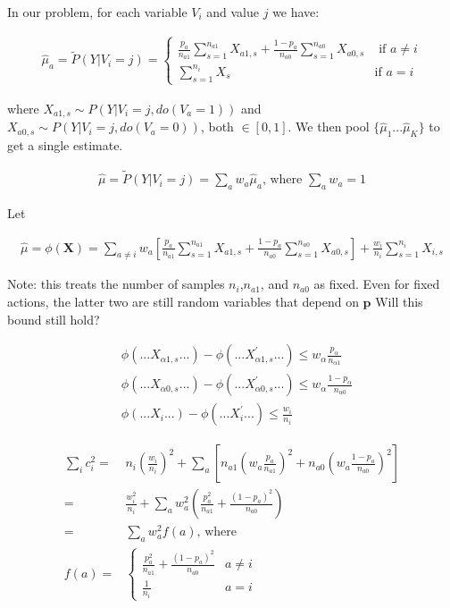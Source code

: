 \documentclass{article}
\newcommand{\eqn}[1]{\begin{align}#1\end{align}}
\theoremstyle{plain}
\theoremstyle{definition}
\begin{document}
In our problem, for each variable $V_i$ and value $j$ we have:

\eqn{
\hat{\mu}_a = \tilde{P}(Y|V_i = j)= \begin{cases}
\frac{p_a}{n_{a1}}\sum_{s=1}^{n_{a1}}X_{a1,s} + \frac{1-p_a}{n_{a0}}\sum_{s=1}^{n_{a0}}X_{a0,s} & \text{ if $a \neq i$}\\
\sum_{s=1}^{n_i}X_s & \text{if $a = i$}
\end{cases}
}

where $X_{a1,s}  \sim P(Y|V_i = j, do(V_a = 1))$ and $X_{a0,s}  \sim P(Y|V_i = j, do(V_a = 0))$, both $\in [0,1]$. We then pool $\{\hat{\mu}_1 ... \hat{\mu}_K \}$ to get a single estimate.

\eqn {
\hat{\mu} = \tilde{P}(Y|V_i = j)= \sum_a w_a \hat{\mu}_a \text{, where } \sum_a w_a = 1
}

Let 

\eqn {
\hat{\mu} = \phi(\boldsymbol{X}) = \sum_{a \neq i} w_a \left[ 
\frac{p_a}{n_{a1}}\sum_{s=1}^{n_{a1}}X_{a1,s} + \frac{1-p_a}{n_{a0}}\sum_{s=1}^{n_{a0}}X_{a0,s}
\right] + \frac{w_i}{n_i} \sum_{s=1}^{n_i}X_{i,s}
}

Note: this treats the number of samples $n_i$,$n_{a1}$, and $n_{a0}$ as fixed. Even for fixed actions, the latter two are still random variables that depend on $\boldsymbol{p}$  Will this bound still hold?  



\eqn {
&\phi(...X_{\alpha 1,s}...) - \phi(...X_{\alpha 1,s}^{'}...) \leq w_\alpha \frac{p_\alpha}{n_{\alpha 1}} \\
&\phi(...X_{\alpha 0,s}...) - \phi(...X_{\alpha 0,s}^{'}...) \leq w_\alpha \frac{1-p_\alpha}{n_{\alpha 0}}\\
& \phi(...X_i...) - \phi(...X_i^{'}...) \leq \frac{w_i}{n_i}
}


\eqn{
\sum_i c_i^2 = & n_i \left(\frac{w_i}{n_i}\right)^2+ \sum_a \left[ n_{a1}\left(w_a \frac{p_a}{n_{a1}}\right)^2 + n_{a0}\left(w_a \frac{1-p_a}{n_{a0}}\right)^2\right]\\
= & \frac{w_i^2}{n_i}+ \sum_a w_a^2 \left(\frac{p_a^2}{n_{a1}}+  \frac{(1-p_a)^2}{n_{a0}} \right) \\
\label{eq:tominimize}
= & \sum_a w_a^2 f(a) \text{, where }\\ 
f(a) =& \begin{cases}
\frac{p_a^2}{n_{a1}}+  \frac{(1-p_a)^2}{n_{a0}}  & a \neq i\\
\frac{1}{n_i} & a = i
\end{cases}
}
\end{document}
